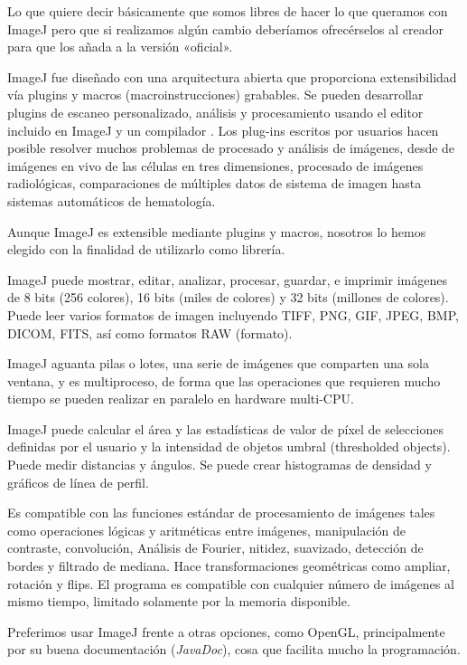 Lo que quiere decir básicamente que somos libres de hacer lo que queramos con ImageJ pero que si realizamos algún cambio deberíamos ofrecérselos al creador para que los añada a la versión «oficial».

ImageJ fue diseñado con una arquitectura abierta que proporciona extensibilidad vía plugins \java{} y macros (macroinstrucciones) grabables. Se pueden desarrollar plugins de escaneo personalizado, análisis y procesamiento usando el editor incluido en ImageJ y un compilador \java{}. Los plug-ins escritos por usuarios hacen posible resolver muchos problemas de procesado y análisis de imágenes, desde de imágenes en vivo de las células en tres dimensiones, procesado de imágenes radiológicas, comparaciones de múltiples datos de sistema de imagen hasta sistemas automáticos de hematología.

Aunque ImageJ es extensible mediante plugins y macros, nosotros lo hemos elegido con la finalidad de utilizarlo como librería.

ImageJ puede mostrar, editar, analizar, procesar, guardar, e imprimir imágenes de 8 bits (256 colores), 16 bits (miles de colores) y 32 bits (millones de colores). Puede leer varios formatos de imagen incluyendo TIFF, PNG, GIF, JPEG, BMP, DICOM, FITS, así como formatos RAW (formato).

ImageJ aguanta pilas o lotes, una serie de imágenes que comparten una sola ventana, y es multiproceso, de forma que las operaciones que requieren mucho tiempo se pueden realizar en paralelo en hardware multi-CPU.

ImageJ puede calcular el área y las estadísticas de valor de píxel de selecciones definidas por el usuario y la intensidad de objetos umbral (thresholded objects). Puede medir distancias y ángulos. Se puede crear histogramas de densidad y gráficos de línea de perfil.

Es compatible con las funciones estándar de procesamiento de imágenes tales como operaciones lógicas y aritméticas entre imágenes, manipulación de contraste, convolución, Análisis de Fourier, nitidez, suavizado, detección de bordes y filtrado de mediana. Hace transformaciones geométricas como ampliar, rotación y flips. El programa es compatible con cualquier número de imágenes al mismo tiempo, limitado solamente por la memoria disponible.

Preferimos usar ImageJ frente a otras opciones, como OpenGL, principalmente por su buena documentación (\textit{JavaDoc}), cosa que facilita mucho la programación.


